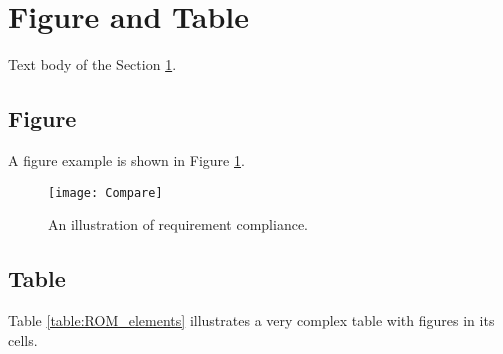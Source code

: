  \section{Figure and Table} \label{sec:FigureAndTable}

 Text body of the Section \ref{sec:FigureAndTable}.
 
 \subsection{Figure}  \label{subSec:Figure}

 A figure example is shown in Figure \ref{fig:Compare}.
 
 \begin{figure}
     \begin{center}
         \texttt{[image: Compare]}  %
        \end{center}
        \caption{An illustration of requirement compliance.}
        \label{fig:Compare}
    \end{figure}
    

\subsection{Table}  \label{subSec:Table}
    
 Table \ref{table:ROM_elements} illustrates a very complex table with figures in its cells.
 
